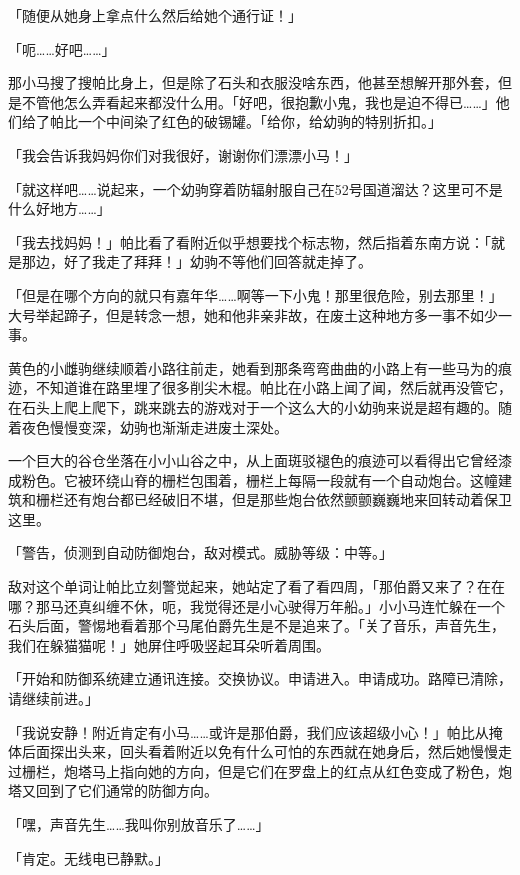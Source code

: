 「随便从她身上拿点什么然后给她个通行证！」

「呃……好吧……」

那小马搜了搜帕比身上，但是除了石头和衣服没啥东西，他甚至想解开那外套，但是不管他怎么弄看起来都没什么用。「好吧，很抱歉小鬼，我也是迫不得已……」他们给了帕比一个中间染了红色的破锡罐。「给你，给幼驹的特别折扣。」

「我会告诉我妈妈你们对我很好，谢谢你们漂漂小马！」

「就这样吧……说起来，一个幼驹穿着防辐射服自己在52号国道溜达？这里可不是什么好地方……」

「我去找妈妈！」帕比看了看附近似乎想要找个标志物，然后指着东南方说：「就是那边，好了我走了拜拜！」幼驹不等他们回答就走掉了。

「但是在哪个方向的就只有嘉年华……啊等一下小鬼！那里很危险，别去那里！」大号举起蹄子，但是转念一想，她和他非亲非故，在废土这种地方多一事不如少一事。

黄色的小雌驹继续顺着小路往前走，她看到那条弯弯曲曲的小路上有一些马为的痕迹，不知道谁在路里埋了很多削尖木棍。帕比在小路上闻了闻，然后就再没管它，在石头上爬上爬下，跳来跳去的游戏对于一个这么大的小幼驹来说是超有趣的。随着夜色慢慢变深，幼驹也渐渐走进废土深处。

\horizonline


一个巨大的谷仓坐落在小小山谷之中，从上面斑驳褪色的痕迹可以看得出它曾经漆成粉色。它被环绕山脊的栅栏包围着，栅栏上每隔一段就有一个自动炮台。这幢建筑和栅栏还有炮台都已经破旧不堪，但是那些炮台依然颤颤巍巍地来回转动着保卫这里。

「{\mt 警告，侦测到自动防御炮台，敌对模式。威胁等级：中等。}」

敌对这个单词让帕比立刻警觉起来，她站定了看了看四周，「那伯爵又来了？在在哪？那马还真纠缠不休，呃，我觉得还是小心驶得万年船。」小小马连忙躲在一个石头后面，警惕地看着那个马尾伯爵先生是不是追来了。「关了音乐，声音先生，我们在躲猫猫呢！」她屏住呼吸竖起耳朵听着周围。

「{\mt 开始和防御系统建立通讯连接。交换协议。申请进入。申请成功。路障已清除，请继续前进。}」

「我说安静！附近肯定有小马……或许是那伯爵，我们应该超级小心！」帕比从掩体后面探出头来，回头看着附近以免有什么可怕的东西就在她身后，然后她慢慢走过栅栏，炮塔马上指向她的方向，但是它们在罗盘上的红点从红色变成了粉色，炮塔又回到了它们通常的防御方向。

「嘿，声音先生……我叫你别放音乐了……」

「{\mt 肯定。无线电已静默。}」

